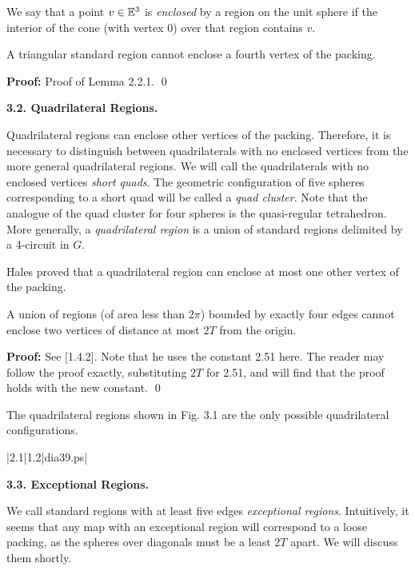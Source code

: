 We say that a point $v\in{\Bbb E}^3$ is {\it enclosed\/} by a region
on the unit sphere if the interior of the cone 
(with vertex $0$) over that region contains
$v$. 

 A triangular standard region cannot enclose a fourth 
vertex of the packing. \endproclaim

{\bf Proof:} Proof of Lemma 2.2.1. \qed

\bigskip

{\bf 3.2. Quadrilateral Regions.}

\bigskip

Quadrilateral regions can enclose other vertices of the packing.  Therefore, it is 
necessary to distinguish between quadrilaterals with no enclosed vertices from
the more general quadrilateral regions.  We will call the quadrilaterals
with no enclosed vertices {\it short quads}.  The geometric configuration of five spheres
corresponding to a short quad will be called a {\it quad cluster}.  
Note that the analogue of the quad cluster for four spheres 
is the quasi-regular tetrahedron.  More generally, a {\it quadrilateral region}
 is a union of standard regions delimited by a 4-circuit in $G$.  

Hales proved that a quadrilateral region can enclose at most one other vertex of the packing.


 A union of regions (of area less than $2\pi$) 
bounded by exactly four edges cannot enclose two vertices of distance at 
most $2T$ from the origin.  \endproclaim

{\bf Proof:} See [1.4.2].  Note that he uses the constant 2.51 here. 
 The reader may follow the proof exactly, substituting $2T$ for 2.51, and will 
find that the proof holds with the new constant. \qed

\bigskip

 The quadrilateral regions shown in Fig. 3.1 are the only
 possible quadrilateral configurations.  \endproclaim


\gram|2.1|1.2|dia39.ps|  %


\bigskip

{\bf 3.3. Exceptional Regions.}

\bigskip

We call standard regions with at least five edges {\it exceptional regions}.  
Intuitively, it seems that any map with an exceptional region will correspond
to a loose packing, as the spheres over diagonals must be a least $2T$ apart.  
We will
discuss them shortly.

